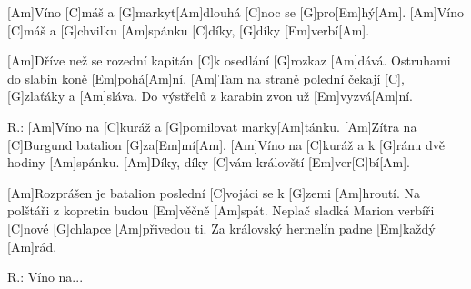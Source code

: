 
[Am]Víno [C]máš a [G]markyt[Am]dlouhá [C]noc se [G]pro[Em]hý[Am].
[Am]Víno [C]máš a [G]chvilku [Am]spánku
[C]díky, [G]díky [Em]verbí[Am].

[Am]Dříve než se rozední
kapitán [C]k osedlání [G]rozkaz [Am]dává.
Ostruhami do slabin koně [Em]pohá[Am]ní.
[Am]Tam na straně polední
čekají [C], [G]zlaťáky a [Am]sláva.
Do výstřelů z karabin zvon už [Em]vyzvá[Am]ní.

R.: [Am]Víno na [C]kuráž a [G]pomilovat marky[Am]tánku.
[Am]Zítra na [C]Burgund batalion [G]za[Em]mí[Am].
[Am]Víno na [C]kuráž a k [G]ránu dvě hodiny [Am]spánku.
[Am]Díky, díky [C]vám královští [Em]ver[G]bí[Am].

[Am]Rozprášen je batalion
poslední [C]vojáci se k [G]zemi [Am]hroutí.
Na polštáři z kopretin budou [Em]věčně [Am]spát.
Neplač sladká Marion
verbíři [C]nové [G]chlapce [Am]přivedou ti.
Za královský hermelín padne [Em]každý [Am]rád.

R.: Víno na...